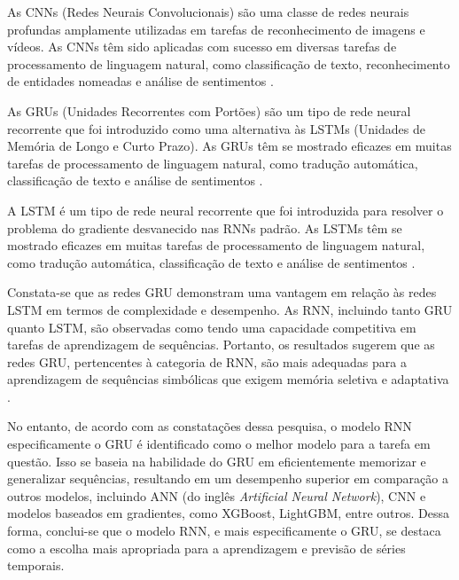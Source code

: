As CNNs (Redes Neurais Convolucionais)  são uma classe de redes neurais profundas amplamente utilizadas em tarefas de reconhecimento de imagens e vídeos. As CNNs têm sido aplicadas com sucesso em diversas tarefas de processamento de linguagem natural, como classificação de texto, reconhecimento de entidades nomeadas e análise de sentimentos \cite{cnn}.
		
As GRUs (Unidades Recorrentes com Portões) são um tipo de rede neural recorrente que foi introduzido como uma alternativa às LSTMs (Unidades de Memória de Longo e Curto Prazo). As GRUs têm se mostrado eficazes em muitas tarefas de processamento de linguagem natural, como tradução automática, classificação de texto e análise de sentimentos \cite{gru}.
		
A LSTM é um tipo de rede neural recorrente que foi introduzida para resolver o problema do gradiente desvanecido nas RNNs padrão. As LSTMs têm se mostrado eficazes em muitas tarefas de processamento de linguagem natural, como tradução automática, classificação de texto e análise de sentimentos \cite{lstm}.


Constata-se que as redes GRU demonstram uma vantagem em relação às redes LSTM em termos de complexidade e desempenho. As RNN, incluindo tanto GRU quanto LSTM, são observadas como tendo uma capacidade competitiva em tarefas de aprendizagem de sequências. Portanto, os resultados sugerem que as redes GRU, pertencentes à categoria de RNN, são mais adequadas para a aprendizagem de sequências simbólicas que exigem memória seletiva e adaptativa \cite{DBLP:journals/corr/abs-2107-02248}.

No entanto, de acordo com as constatações dessa pesquisa, o modelo RNN especificamente o GRU é identificado como o melhor modelo para a tarefa em questão. Isso se baseia na habilidade do GRU em eficientemente memorizar e generalizar sequências, resultando em um desempenho superior em comparação a outros modelos, incluindo ANN (do inglês \textit{Artificial Neural Network}), CNN e modelos baseados em gradientes, como XGBoost, LightGBM, entre outros. Dessa forma, conclui-se que o modelo RNN, e mais especificamente o GRU, se destaca como a escolha mais apropriada para a aprendizagem e previsão de séries temporais.


